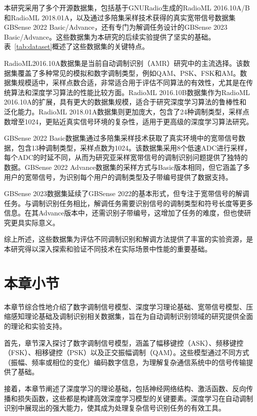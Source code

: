 本研究采用了多个开源数据集，包括基于GNURadio生成的RadioML 2016.10A/B和RadioML 2018.01A，以及通过多陪集采样技术获得的真实宽带信号数据集GBSense 2022 Basic/Advance，还有专门为解调任务设计的GBSense 2023 Basic/Advance。这些数据集为本研究的后续实验提供了坚实的基础。表~\ref{tab:dataset}概述了这些数据集的关键特点。

RadioML2016.10A数据集是当前自动调制识别（AMR）研究中的主流选择。该数据集覆盖了多种常见的模拟和数字调制类型，例如QAM、PSK、FSK和AM。数据集规模适中，采样点数合适，非常适合用于评估不同算法的有效性，尤其是在传统算法和深度学习算法的性能比较方面。RadioML 2016.10B数据集作为RadioML 2016.10A的扩展，具有更大的数据集规模，适合于研究深度学习算法的鲁棒性和泛化能力。RadioML 2018.01A数据集则更加庞大，包含了24种调制类型，采样点数增至1024，更贴近真实信号环境的复杂性，适用于更高级的深度学习算法研究。

GBSense 2022 Basic数据集通过多陪集采样技术获取了真实环境中的宽带信号数据，包含13种调制类型，采样点数为1024。该数据集采用8个低速ADC进行采样，每个ADC的时延不同，从而为研究亚采样宽带信号的调制识别问题提供了独特的数据。GBSense 2022 Advance数据集的采样方式与Basic版本相同，但它涵盖了多用户的宽带信号，为识别每个用户的调制类型及子带编号提供了数据支持。

GBSense 2023数据集延续了GBSense 2022的基本形式，但专注于宽带信号的解调任务。与调制识别任务相比，解调任务需要识别信号的调制类型和符号长度等更多信息。在其Advance版本中，还需识别子带编号，这增加了任务的难度，但也使研究更具实际意义。

综上所述，这些数据集为评估不同调制识别和解调方法提供了丰富的实验资源，是本研究得以深入探索和验证不同技术在实际场景中性能的重要基础。

\section{本章小节}\label{sec:background}
本章节综合性地介绍了数字调制信号模型、深度学习理论基础、宽带信号模型、压缩感知理论基础及调制识别相关数据集，旨在为自动调制识别领域的研究提供全面的理论和实验支持。

首先，章节深入探讨了数字调制信号模型，涵盖了幅移键控（ASK）、频移键控（FSK）、相移键控（PSK）以及正交振幅调制（QAM）。这些模型通过不同方式（振幅、频率或相位的变化）编码数字信息，为理解复杂通信系统中的信号传输提供了基础。

接着，本章节阐述了深度学习的理论基础，包括神经网络结构、激活函数、反向传播和损失函数，这些都是构建高效深度学习模型的关键要素。深度学习在自动调制识别中展现出的强大能力，使其成为处理复杂信号识别任务的有效工具。

